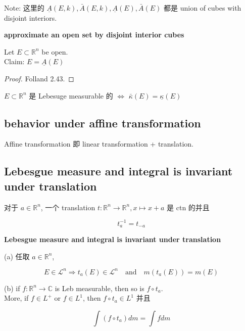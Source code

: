 \documentclass{qlnotes-export}
\begin{document}
Note: 这里的 \(\underset{¯}{A}(E,k),\bar{A}(E,k),\underset{¯}{A}(E),\bar{A}(E)\) 都是 union of cubes with disjoint interiors.

\begin{lemma}{\protect{}\label{kn-approximate-an-open-set-by-disjoint-interior-cubes}{\textbf{approximate
an open set by disjoint interior cubes}}}

Let \(E \subset {\mathbb{R}}^{n}\) be open.\\
Claim: \(E = \underset{¯}{A}(E)\)

\end{lemma}

\begin{proof}

Folland 2.43.

\end{proof}

\begin{corollary}

\(E \subset {\mathbb{R}}^{n}\) 是 Lebesuge measurable 的 \(\Leftrightarrow\) \(\bar{\kappa}(E) = \underset{¯}{\kappa}(E)\)

\end{corollary}

\subsection{behavior under affine transformation}\label{behavior-under-affine-transformation}

Affine transformation 即 linear transformation + translation.

\subsection{Lebesgue measure and integral is invariant under translation}\label{lebesgue-measure-and-integral-is-invariant-under-translation}

对于 \(a \in {\mathbb{R}}^{n}\), 一个 translation \(t:{\mathbb{R}}^{n}\rightarrow{\mathbb{R}}^{n},x\mapsto x + a\) 是 ctn 的并且

\[t_{a}^{- 1} = t_{- a}\]

\begin{theorem}{\protect{}\label{kn-lebesgue-measure-and-integral-is-invariant-under-translation}{\textbf{Lebesgue
measure and integral is invariant under translation}}}

(a) 任取 \(a \in {\mathbb{R}}^{n}\),

\[E \in \mathcal{L}^{n}\Longrightarrow t_{a}(E) \in \mathcal{L}^{n}\quad\text{and}\quad m(t_{a}(E)) = m(E)\]

(b) if \(f:{\mathbb{R}}^{n}\rightarrow{\mathbb{C}}\) is Leb measurable, then so is \(f \circ t_{a}\).\\
More, if \(f \in L^{+}\) or \(f \in L^{1}\), then \(f \circ t_{a} \in L^{1}\) 并且

\[\int(f \circ t_{a}) dm = \int f dm\]

\end{theorem}
\end{document}
